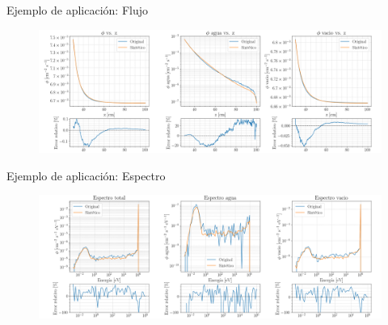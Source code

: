 \documentclass[aspectratio=169,english]{beamer}
\begin{document}
\begin{frame}{Ejemplo de aplicación: Flujo}
    \begin{figure}
        \centering
        \includegraphics[width=1\linewidth]{imagens/resultados_flujo.png}
        \label{fig:flujos.png}
    \end{figure}
    

\end{frame}

\begin{frame}{Ejemplo de aplicación: Espectro}
    
    \begin{figure}
        \centering
        \includegraphics[width=1\linewidth]{imagens/resultados_espectro.png}
        \label{fig:espectros.png}
    \end{figure}

\end{frame}

\end{document}
